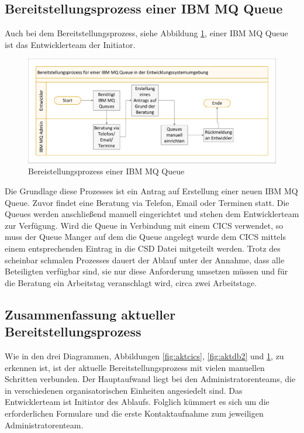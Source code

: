 \subsection{Bereitstellungsprozess einer IBM MQ Queue}
Auch bei dem Bereitstellungsprozess, siehe Abbildung \ref{fig:aktmq}, einer IBM MQ Queue ist das Entwicklerteam der Initiator.

\begin{figure}[ht!]
\centering
\includegraphics[width=\paperwidth,angle=90]{figures/swimlaneMQ.pdf}
\caption{Bereistellungsprozess einer IBM MQ Queue}
\label{fig:aktmq}
\end{figure}

Die Grundlage diese Prozesses ist ein Antrag auf Erstellung einer neuen IBM MQ Queue.
Zuvor findet eine Beratung via Telefon, Email oder Terminen statt.
Die Queues werden anschließend manuell eingerichtet und stehen dem Entwicklerteam zur Verfügung.
Wird die Queue in Verbindung mit einem CICS verwendet, so muss der Queue Manger auf dem die Queue angelegt wurde dem CICS mittels einem entsprechenden Eintrag in die CSD Datei mitgeteilt werden.
Trotz des scheinbar schmalen Prozesses dauert der Ablauf unter der Annahme, dass alle Beteiligten verfügbar sind, sie nur diese Anforderung umsetzen müssen und für die Beratung ein Arbeitstag veranschlagt wird, circa zwei Arbeitstage.

\subsection{Zusammenfassung aktueller Bereitstellungsprozess}\label{ssec:sumaktbereit}
Wie in den drei Diagrammen, Abbildungen \ref{fig:aktcics}, \ref{fig:aktdb2} und \ref{fig:aktmq}, zu erkennen ist, ist der aktuelle Bereitstellungsprozess mit vielen manuellen Schritten verbunden.
Der Hauptaufwand liegt bei den Administratorenteams, die in verschiedenen organisatorischen Einheiten angesiedelt sind.
Das Entwicklerteam ist  Initiator des Ablaufs.
Folglich kümmert es sich um die erforderlichen Formulare und die erste Kontaktaufnahme zum jeweiligen Administratorenteam.

